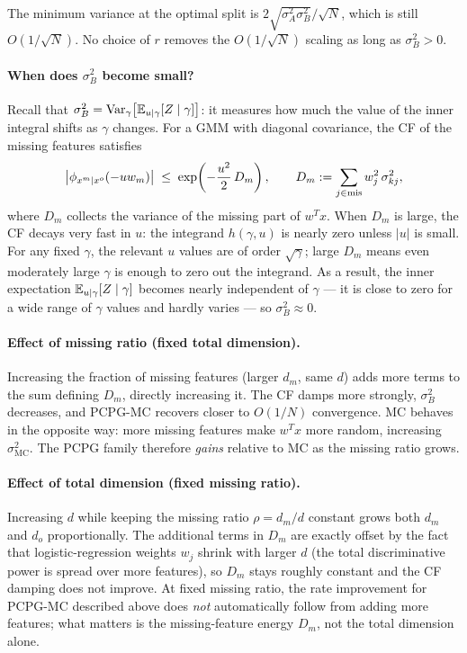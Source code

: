 The minimum variance at the optimal split is $2\sqrt{\sigma^2_A\sigma^2_B}/\sqrt{N}$,
which is still $O(1/\sqrt{N})$.
No choice of $r$ removes the $O(1/\sqrt{N})$ scaling as long as $\sigma^2_B > 0$.

\paragraph{When does $\sigma^2_B$ become small?}
Recall that $\sigma^2_B = \mathrm{Var}_\gamma\!\left[\mathbb{E}_{u\mid\gamma}[Z\mid\gamma]\right]$:
it measures how much the value of the inner integral shifts as $\gamma$ changes.
For a GMM with diagonal covariance, the CF of the missing features satisfies
\[
  \bigl|\phi_{x^m\mid x^o}(-uw_m)\bigr|
  \;\leq\;
  \exp\!\left(-\frac{u^2}{2}\,D_m\right),
  \qquad
  D_m := \sum_{j \in \mathrm{mis}} w_j^2\,\sigma_{kj}^2,
\]
where $D_m$ collects the variance of the missing part of $w^T x$.
When $D_m$ is large, the CF decays very fast in $u$: the integrand $h(\gamma,u)$
is nearly zero unless $|u|$ is small.
For any fixed $\gamma$, the relevant $u$ values are of order $\sqrt{\gamma}$;
large $D_m$ means even moderately large $\gamma$ is enough to zero out the integrand.
As a result, the inner expectation $\mathbb{E}_{u\mid\gamma}[Z\mid\gamma]$ becomes nearly
independent of $\gamma$ --- it is close to zero for a wide range of $\gamma$ values
and hardly varies --- so $\sigma^2_B \approx 0$.

\paragraph{Effect of missing ratio (fixed total dimension).}
Increasing the fraction of missing features (larger $d_m$, same $d$) adds more terms
to the sum defining $D_m$, directly increasing it.
The CF damps more strongly, $\sigma^2_B$ decreases, and PCPG-MC recovers closer to
$O(1/N)$ convergence.  MC behaves in the opposite way: more missing features make
$w^T x$ more random, increasing $\sigma^2_{\mathrm{MC}}$.
The PCPG family therefore \emph{gains} relative to MC as the missing ratio grows.

\paragraph{Effect of total dimension (fixed missing ratio).}
Increasing $d$ while keeping the missing ratio $\rho = d_m/d$ constant grows both
$d_m$ and $d_o$ proportionally.
The additional terms in $D_m$ are exactly offset by the fact that logistic-regression
weights $w_j$ shrink with larger $d$ (the total discriminative power is spread over
more features), so $D_m$ stays roughly constant and the CF damping does not improve.
At fixed missing ratio, the rate improvement for PCPG-MC described above does
\emph{not} automatically follow from adding more features; what matters is the
missing-feature energy $D_m$, not the total dimension alone.

